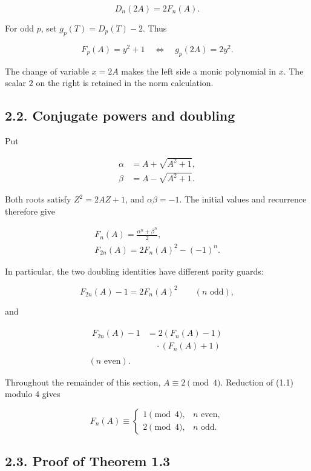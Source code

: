 \documentclass[11pt,a4paper]{article}
\begin{document}
\[
D_n(2A)=2F_n(A).
\tag{2.2}
\]

For odd \(p\), set \(g_p(T)=D_p(T)-2\). Thus

\[
F_p(A)=y^2+1
\quad\Longleftrightarrow\quad
g_p(2A)=2y^2.
\tag{2.3}
\]

The change of variable \(x=2A\) makes the left side a monic polynomial
in \(x\). The scalar \(2\) on the right is retained in the norm
calculation.

\subsection{2.2. Conjugate powers and doubling}\label{doubling}

Put

\[
\begin{aligned}
\alpha&=A+\sqrt{A^2+1},\\
\beta&=A-\sqrt{A^2+1}.
\end{aligned}
\]

Both roots satisfy \(Z^2=2AZ+1\), and \(\alpha\beta=-1\). The initial
values and recurrence therefore give

\[
\begin{gathered}
F_n(A)=\frac{\alpha^n+\beta^n}{2},\\
F_{2n}(A)=2F_n(A)^2-(-1)^n.
\end{gathered}
\tag{2.4}
\]

In particular, the two doubling identities have different parity guards:

\[
F_{2n}(A)-1=2F_n(A)^2
\qquad(n\text{ odd}),
\tag{2.5}
\]

and

\[
\begin{gathered}
\begin{aligned}
F_{2n}(A)-1
&=2(F_n(A)-1)\\
&\quad\cdot(F_n(A)+1)
\end{aligned}\\
(n\text{ even}).
\end{gathered}
\tag{2.6}
\]

Throughout the remainder of this section, \(A\equiv2\pmod4\). Reduction
of (1.1) modulo \(4\) gives

\[
F_n(A)\equiv
\begin{cases}
1\pmod4,&n\text{ even},\\
2\pmod4,&n\text{ odd}.
\end{cases}
\tag{2.7}
\]

\subsection{2.3. Proof of Theorem 1.3}\label{proof-even}
\end{document}
